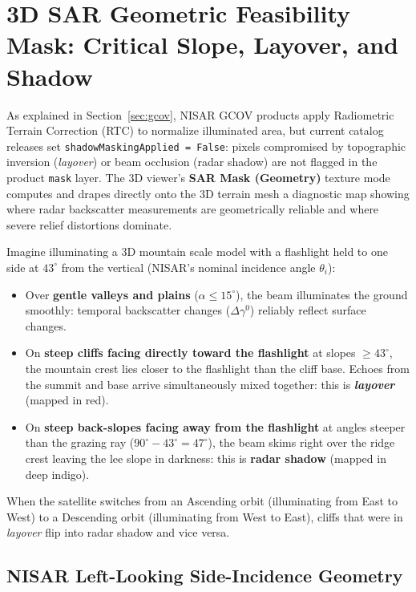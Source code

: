 \documentclass[11pt,a4paper]{article}
\begin{document}
\section{3D SAR Geometric Feasibility Mask: Critical Slope, Layover, and Shadow}
\label{sec:relieve3d-mascara-sar}

As explained in Section~\ref{sec:gcov}, NISAR GCOV products apply Radiometric Terrain Correction (RTC) to normalize illuminated area, but current catalog releases set \texttt{shadowMaskingApplied = False}: pixels compromised by topographic inversion (\emph{layover}) or beam occlusion (radar shadow) are not flagged in the product \texttt{mask} layer. The 3D viewer's \textbf{SAR Mask (Geometry)} texture mode computes and drapes directly onto the 3D terrain mesh a diagnostic map showing where radar backscatter measurements are geometrically reliable and where severe relief distortions dominate.

\begin{intuicion}
Imagine illuminating a 3D mountain scale model with a flashlight held to one side at $43^\circ$ from the vertical (NISAR's nominal incidence angle $\theta_i$):
\begin{itemize}
  \item Over \textbf{gentle valleys and plains} ($\alpha \le 15^\circ$), the beam illuminates the ground smoothly: temporal backscatter changes ($\Delta\gamma^0$) reliably reflect surface changes.
  \item On \textbf{steep cliffs facing directly toward the flashlight} at slopes $\ge 43^\circ$, the mountain crest lies closer to the flashlight than the cliff base. Echoes from the summit and base arrive simultaneously mixed together: this is \textbf{\emph{layover}} (mapped in red).
  \item On \textbf{steep back-slopes facing away from the flashlight} at angles steeper than the grazing ray ($90^\circ - 43^\circ = 47^\circ$), the beam skims right over the ridge crest leaving the lee slope in darkness: this is \textbf{radar shadow} (mapped in deep indigo).
\end{itemize}
When the satellite switches from an Ascending orbit (illuminating from East to West) to a Descending orbit (illuminating from West to East), cliffs that were in \emph{layover} flip into radar shadow and vice versa.
\end{intuicion}

\subsection{NISAR Left-Looking Side-Incidence Geometry}
\label{sec:relieve3d-geometria-nisar}
\end{document}
